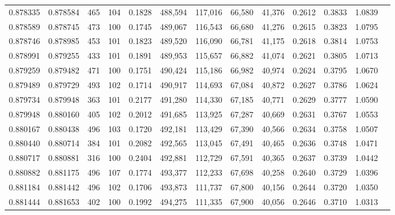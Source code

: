 \begin{tabular}{rrrrrrrrrrrrr}
0.878335 & 0.878584 &   465 & 104 &                                     0.1828 & 488,594 & 117,016 &  66,580 &  41,376 & 0.2612 & 0.3833 & 1.0839 \\
0.878589 & 0.878745 &   473 & 100 &                                     0.1745 & 489,067 & 116,543 &  66,680 &  41,276 & 0.2615 & 0.3823 & 1.0795 \\
0.878746 & 0.878985 &   453 & 101 &                                     0.1823 & 489,520 & 116,090 &  66,781 &  41,175 & 0.2618 & 0.3814 & 1.0753 \\
0.878991 & 0.879255 &   433 & 101 &                                     0.1891 & 489,953 & 115,657 &  66,882 &  41,074 & 0.2621 & 0.3805 & 1.0713 \\
0.879259 & 0.879482 &   471 & 100 &                                     0.1751 & 490,424 & 115,186 &  66,982 &  40,974 & 0.2624 & 0.3795 & 1.0670 \\
0.879489 & 0.879729 &   493 & 102 &                                     0.1714 & 490,917 & 114,693 &  67,084 &  40,872 & 0.2627 & 0.3786 & 1.0624 \\
0.879734 & 0.879948 &   363 & 101 &                                     0.2177 & 491,280 & 114,330 &  67,185 &  40,771 & 0.2629 & 0.3777 & 1.0590 \\
0.879948 & 0.880160 &   405 & 102 &                                     0.2012 & 491,685 & 113,925 &  67,287 &  40,669 & 0.2631 & 0.3767 & 1.0553 \\
0.880167 & 0.880438 &   496 & 103 &                                     0.1720 & 492,181 & 113,429 &  67,390 &  40,566 & 0.2634 & 0.3758 & 1.0507 \\
0.880440 & 0.880714 &   384 & 101 &                                     0.2082 & 492,565 & 113,045 &  67,491 &  40,465 & 0.2636 & 0.3748 & 1.0471 \\
0.880717 & 0.880881 &   316 & 100 &                                     0.2404 & 492,881 & 112,729 &  67,591 &  40,365 & 0.2637 & 0.3739 & 1.0442 \\
0.880882 & 0.881175 &   496 & 107 &                                     0.1774 & 493,377 & 112,233 &  67,698 &  40,258 & 0.2640 & 0.3729 & 1.0396 \\
0.881184 & 0.881442 &   496 & 102 &                                     0.1706 & 493,873 & 111,737 &  67,800 &  40,156 & 0.2644 & 0.3720 & 1.0350 \\
0.881444 & 0.881653 &   402 & 100 &                                     0.1992 & 494,275 & 111,335 &  67,900 &  40,056 & 0.2646 & 0.3710 & 1.0313 \\

\end{tabular}
